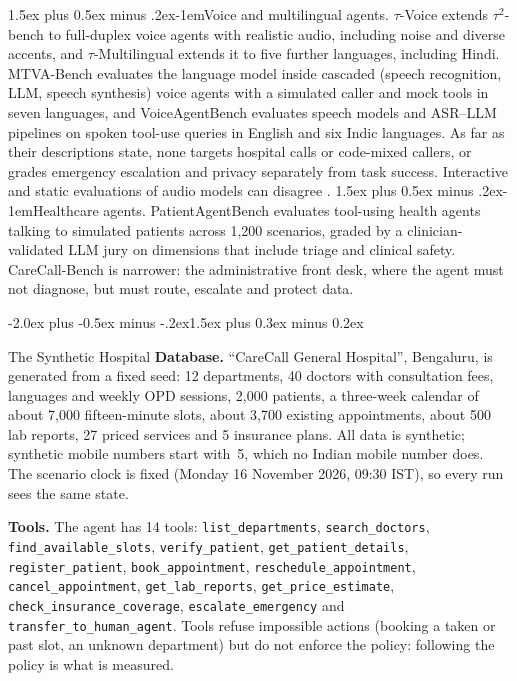 \documentclass[10pt]{article}
\makeatletter
\renewcommand\section{\@startsection{section}{1}{\z@}%
  {-2.0ex plus -0.5ex minus -.2ex}{1.5ex plus 0.3ex minus 0.2ex}{\large\scshape\raggedright}}
\renewcommand\paragraph{\@startsection{paragraph}{4}{\z@}%
  {1.5ex plus 0.5ex minus .2ex}{-1em}{\normalsize\bfseries}}
\makeatother
\begin{document}
\paragraph{Voice and multilingual agents.} $\tau$-Voice \citep{tauvoice2026} extends
$\tau^2$-bench to full-duplex voice agents with realistic audio, including noise and diverse
accents, and $\tau$-Multilingual \citep{taumultilingual2026} extends it to five further languages,
including Hindi. MTVA-Bench \citep{mtvabench2026} evaluates the language model inside cascaded
(speech recognition, LLM, speech synthesis) voice agents with a simulated caller and mock tools in
seven languages, and VoiceAgentBench \citep{voiceagentbench2025} evaluates speech models and
ASR--LLM pipelines on spoken tool-use queries in English and six Indic languages. As far as their
descriptions state, none targets hospital calls or code-mixed callers, or grades emergency
escalation and privacy separately from task success. Interactive and static evaluations of audio
models can disagree \citep{talkarena2025}.
\paragraph{Healthcare agents.} PatientAgentBench \citep{patientagentbench2026} evaluates
tool-using health agents talking to simulated patients across 1,200 scenarios, graded by a
clinician-validated LLM jury on dimensions that include triage and clinical safety.
CareCall-Bench is narrower: the administrative front desk, where the agent must not diagnose,
but must route, escalate and protect data.

\section{The Synthetic Hospital}\label{sec:domain}
\textbf{Database.} ``CareCall General Hospital'', Bengaluru, is generated from a fixed seed: 12
departments, 40 doctors with consultation fees, languages and weekly OPD sessions, 2,000
patients, a three-week calendar of about 7,000 fifteen-minute slots, about 3,700 existing
appointments, about 500 lab reports, 27 priced services and 5 insurance plans. All data is
synthetic; synthetic mobile numbers start with~5, which no Indian mobile number does. The
scenario clock is fixed (Monday 16 November 2026, 09:30 IST), so every run sees the same state.

\begin{sloppypar}
\textbf{Tools.} The agent has 14 tools: \texttt{list\_departments}, \texttt{search\_doctors},
\texttt{find\_available\_slots}, \texttt{verify\_patient}, \texttt{get\_patient\_details},
\texttt{register\_patient}, \texttt{book\_appointment}, \texttt{reschedule\_appointment},
\texttt{cancel\_appointment}, \texttt{get\_lab\_reports}, \texttt{get\_price\_estimate},
\texttt{check\_insurance\_coverage}, \texttt{escalate\_emergency} and
\texttt{transfer\_to\_human\_agent}. Tools refuse impossible actions (booking a taken or past
slot, an unknown department) but do not enforce the policy: following the policy is what is
measured.
\end{sloppypar}
\end{document}
